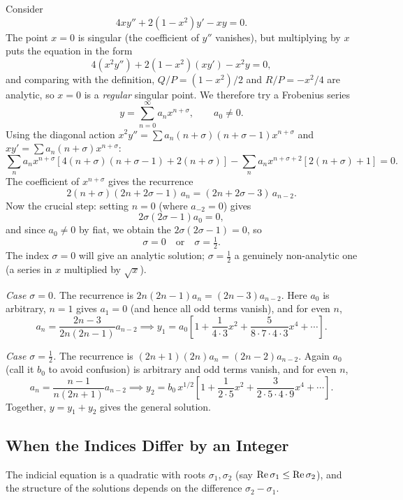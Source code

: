 \documentclass[a4paper]{scrartcl}
\begin{document}
\begin{example}
	Consider
	$$
	4x y'' + 2(1 - x^2) y' - xy = 0.
	$$
	The point $x = 0$ is singular (the coefficient of $y''$ vanishes), but multiplying by $x$ puts the equation in the form
	$$
	4 (x^2 y'') + 2(1 - x^2)(xy') - x^2 y = 0,
	$$
	and comparing with the definition, $Q/P = (1 - x^2)/2$ and $R/P = -x^2/4$ are analytic, so $x = 0$ is a \emph{regular} singular point. We therefore try a Frobenius series
	$$
	y = \sum_{n = 0}^{\infty} a_n x^{n + \sigma}, \qquad a_0 \neq 0.
	$$
	Using the diagonal action $x^2 y'' = \sum a_n (n + \sigma)(n + \sigma - 1) x^{n + \sigma}$ and $xy' = \sum a_n (n + \sigma)x^{n + \sigma}$:
	$$
	\sum_n a_n x^{n + \sigma}\left[4(n + \sigma)(n + \sigma - 1) + 2(n + \sigma)\right] - \sum_n a_n x^{n + \sigma + 2}\left[2(n + \sigma) + 1\right] = 0.
	$$
	The coefficient of $x^{n + \sigma}$ gives the recurrence
	$$
	2(n + \sigma)(2n + 2\sigma - 1) \, a_n = (2n + 2\sigma - 3)\, a_{n - 2}.
	$$
	Now the crucial step: setting $n = 0$ (where $a_{-2} = 0$) gives
	$$
	2\sigma(2\sigma - 1) a_0 = 0,
	$$
	and since $a_0 \neq 0$ by fiat, we obtain the  $2\sigma(2\sigma - 1) = 0$, so
	$$
	\sigma = 0 \quad \text{or} \quad \sigma = \tfrac 12.
	$$
	The index $\sigma = 0$ will give an analytic solution; $\sigma = \frac12$ a genuinely non-analytic one (a series in $x$ multiplied by $\sqrt x$).

	\emph{Case $\sigma = 0$.} The recurrence is $2n(2n - 1) a_n = (2n - 3) a_{n - 2}$. Here $a_0$ is arbitrary, $n = 1$ gives $a_1 = 0$ (and hence all odd terms vanish), and for even $n$,
	$$
	a_n = \frac{2n - 3}{2n(2n-1)} a_{n - 2} \implies y_1 = a_0 \left[1 + \frac{1}{4 \cdot 3}x^2 + \frac{5}{8 \cdot 7 \cdot 4 \cdot 3}x^4 + \cdots\right].
	$$

	\emph{Case $\sigma = \frac12$.} The recurrence is $(2n + 1)(2n) a_n = (2n - 2) a_{n - 2}$. Again $a_0$ (call it $b_0$ to avoid confusion) is arbitrary and odd terms vanish, and for even $n$,
	$$
	a_n = \frac{n - 1}{n(2n + 1)} a_{n - 2} \implies y_2 = b_0 \, x^{1/2}\left[1 + \frac{1}{2 \cdot 5}x^2 + \frac{3}{2 \cdot 5 \cdot 4 \cdot 9}x^4 + \cdots \right].
	$$
	Together, $y = y_1 + y_2$ gives the general solution.
\end{example}

\subsection{When the Indices Differ by an Integer}

The indicial equation is a quadratic with roots $\sigma_1, \sigma_2$ (say $\operatorname{Re} \sigma_1 \leq \operatorname{Re} \sigma_2$), and the structure of the solutions depends on the difference $\sigma_2 - \sigma_1$.
\end{document}
